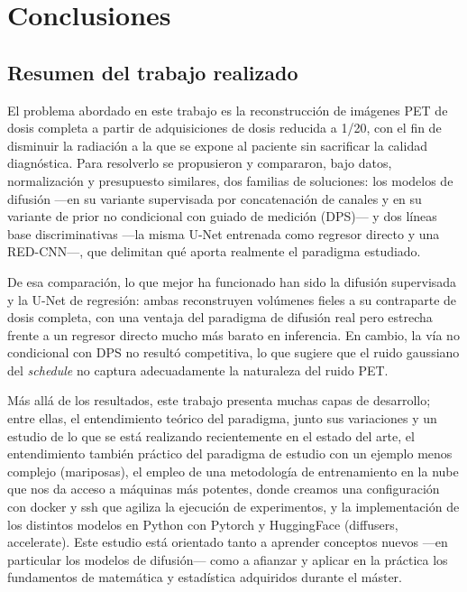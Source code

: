 \chapter{Conclusiones}
\label{cap:conclusiones}

\section{Resumen del trabajo realizado}
\label{sec:resumen}

El problema abordado en este trabajo es la reconstrucción de
imágenes PET de dosis completa a partir de adquisiciones de dosis
reducida a 1/20, con el fin de disminuir la radiación a la que se
expone al paciente sin sacrificar la calidad diagnóstica. Para
resolverlo se propusieron y compararon, bajo datos, normalización
y presupuesto similares, dos familias de soluciones: los modelos de
difusión —en su variante supervisada por concatenación de canales y
en su variante de prior no condicional con guiado de medición
(DPS)— y dos líneas base discriminativas —la misma U-Net entrenada
como regresor directo y una RED-CNN—, que delimitan qué aporta
realmente el paradigma estudiado.

De esa comparación, lo que mejor ha funcionado han sido la difusión
supervisada y la U-Net de regresión: ambas reconstruyen
volúmenes fieles a su contraparte de dosis completa, con una ventaja
del paradigma de difusión real pero estrecha frente a un regresor
directo mucho más barato en inferencia. En cambio, la vía no
condicional con DPS no resultó competitiva, lo que sugiere que el
ruido gaussiano del \textit{schedule} no captura adecuadamente la
naturaleza del ruido PET.

Más allá de los resultados, este trabajo presenta muchas capas de desarrollo; entre ellas,
el entendimiento teórico del paradigma, junto sus variaciones y un estudio de lo que se está realizando
recientemente en el estado del arte, el entendimiento también práctico del paradigma de estudio con un 
ejemplo menos complejo (mariposas), el empleo de una metodología de entrenamiento en la nube que nos
da acceso a máquinas más potentes, donde creamos una configuración con docker y ssh que agiliza la 
ejecución de experimentos, y la implementación de los distintos modelos en Python con Pytorch y HuggingFace 
(diffusers, accelerate). Este estudio está orientado tanto a aprender conceptos nuevos 
---en particular los modelos de difusión--- como a afianzar y aplicar en la práctica los fundamentos de
matemática y estadística adquiridos durante el máster.

